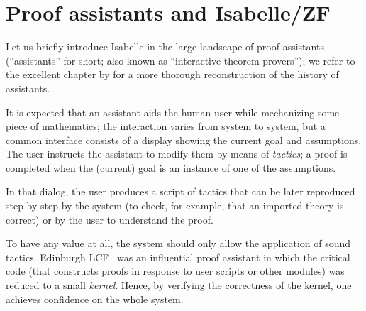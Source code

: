 \section{Proof assistants and Isabelle/ZF}
\label{sec:proof-assist-isabelle}

Let us briefly introduce Isabelle \cite{DBLP:books/sp/Paulson94} in the large landscape of proof
assistants (“assistants” for short; also known as “interactive theorem provers”); we refer to the
excellent chapter by \citet{DBLP:series/hhl/HarrisonUW14} for a more
thorough reconstruction of the history of assistants.

It is expected that an assistant aids the human user while mechanizing
some piece of mathematics; the interaction varies from system to
system, but a common interface consists of a display showing the
current goal and assumptions. The user instructs the assistant to
modify them by means of \emph{tactics}; a %
proof is completed when the (current) goal is an instance of one of
the assumptions.

In that dialog, the user produces a script of tactics that can be
later reproduced step-by-step by the system (to check, for example,
that an imported theory is correct) or by the user to understand
the proof.

To have any value at all, the system should only allow the application
of sound tactics.
Edinburgh LCF~\cite{Gordon1979-qm} was an
influential proof assistant in which the critical code (that
constructs proofs in response to user scripts or other modules) was reduced to a small
\emph{kernel}. Hence, by verifying the correctness of the kernel, one
achieves confidence on the whole system.

